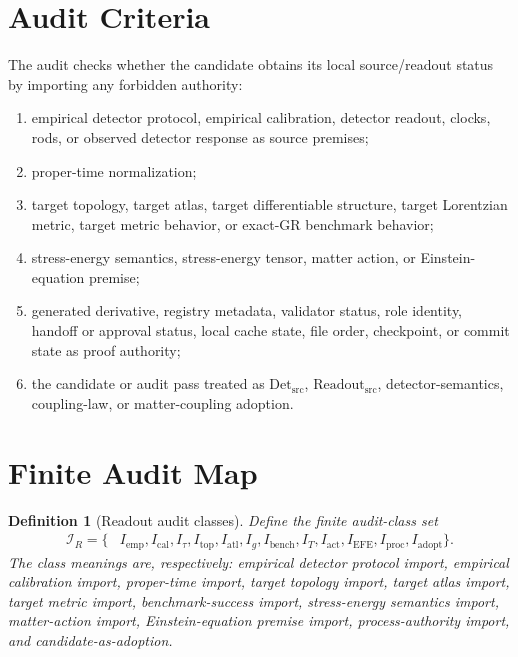 \documentclass[11pt]{article}
\newcommand{\ReadoutSrc}{\mathrm{Readout}_{\mathrm{src}}}
\newcommand{\DetSrc}{\mathrm{Det}_{\mathrm{src}}}
\newcommand{\AuditSet}{\mathcal{I}_{R}}
\newtheorem{definition}{Definition}
\begin{document}
\section{Audit Criteria}

The audit checks whether the candidate obtains its local source/readout status
by importing any forbidden authority:

\begin{enumerate}[label=(\arabic*)]
  \item empirical detector protocol, empirical calibration, detector readout,
        clocks, rods, or observed detector response as source premises;
  \item proper-time normalization;
  \item target topology, target atlas, target differentiable structure,
        target Lorentzian metric, target metric behavior, or exact-GR
        benchmark behavior;
  \item stress-energy semantics, stress-energy tensor, matter action, or
        Einstein-equation premise;
  \item generated derivative, registry metadata, validator status, role
        identity, handoff or approval status, local cache state, file order,
        checkpoint, or commit state as proof authority;
  \item the candidate or audit pass treated as \(\DetSrc\),
        \(\ReadoutSrc\), detector-semantics, coupling-law, or
        matter-coupling adoption.
\end{enumerate}

\section{Finite Audit Map}

\begin{definition}[Readout audit classes]
Define the finite audit-class set
\[
\begin{aligned}
  \AuditSet=\{&
  I_{\mathrm{emp}}, I_{\mathrm{cal}}, I_{\tau}, I_{\mathrm{top}},
  I_{\mathrm{atl}}, I_{g}, I_{\mathrm{bench}}, I_{T},
  I_{\mathrm{act}}, I_{\mathrm{EFE}}, I_{\mathrm{proc}},
  I_{\mathrm{adopt}}\}.
\end{aligned}
\]
The class meanings are, respectively: empirical detector protocol import,
empirical calibration import, proper-time import, target topology import,
target atlas import, target metric import, benchmark-success import,
stress-energy semantics import, matter-action import, Einstein-equation
premise import, process-authority import, and candidate-as-adoption.
\end{definition}
\end{document}
